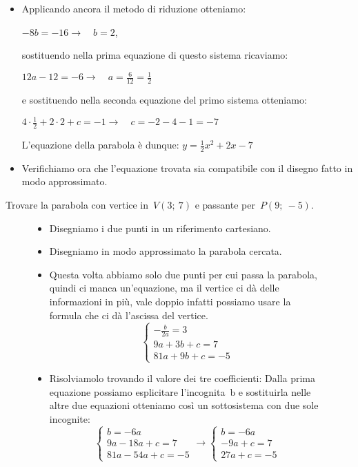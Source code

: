 \begin{exrig}
\begin{esempio}
 \begin{itemize}
  \item Applicando ancora il metodo di riduzione otteniamo: 

$-8b=-16 \rightarrow \quad b=2$, 

sostituendo nella prima equazione di questo sistema ricaviamo:

$12a-12=-6 \rightarrow \quad a=\frac{6}{12}=\frac{1}{2}$

e sostituendo nella seconda equazione del primo sistema otteniamo:

$4 \cdot \frac{1}{2} +2 \cdot 2 +c=-1 \rightarrow \quad c=-2-4-1=-7$

L'equazione della parabola è dunque: $y=\frac{1}{2}x^2+2x-7$

  \item Verifichiamo ora che l'equazione trovata sia compatibile con il disegno 
  fatto in modo approssimato.
 \end{itemize}
\end{esempio}

\begin{esempio}
 Trovare la parabola con vertice in~$V(3;~7)$ e passante per~$P(9;~-5)$.
 
\begin{figure}[h]
\begin{minipage}{.60\textwidth}
 \begin{itemize}
  \item Disegniamo i due punti in un riferimento cartesiano.
  \item Disegniamo in modo approssimato la parabola cercata.
  \item Questa volta abbiamo solo due punti per cui passa la parabola, quindi
   ci manca un'equazione, ma il vertice ci dà delle informazioni in più, 
   vale doppio infatti possiamo usare la formula che ci dà l'ascissa del 
   vertice.
\[\left\{\begin{array}{l}
  -\frac{b}{2a}=3\\
  9a+3b+c=7\\
  81a+9b+c=-5
\end{array}\right. \]
  \item Risolviamolo trovando il valore dei tre coefficienti:
   Dalla prima equazione possiamo esplicitare l'incognita~b e sostituirla
   nelle altre due equazioni otteniamo così un sottosistema con due sole 
   incognite:
\[\left\{\begin{array}{l}
  b=-6a \\
  9a-18a+c=7\\
  81a-54a+c=-5
\end{array}\right. \rightarrow 
\left\{\begin{array}{l}
  b=-6a \\
  -9a+c=7\\
  27a+c=-5
\end{array}\right.\]
 \end{itemize}


\end{minipage}
\end{figure}
\end{esempio}
\end{exrig}
